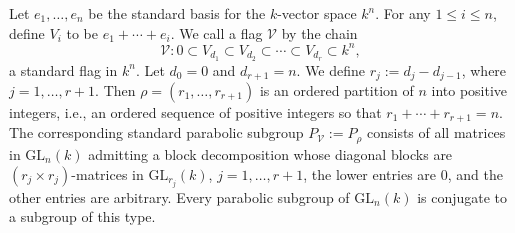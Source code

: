 \documentclass[12pt]{article} %
\begin{document}
Let \( e_1, \ldots, e_n \) be the standard basis for the \( k \)-vector space \( k^n \). For any \( 1 \leq i \leq n \), define \( V_i \) to be \( e_1 + \cdots + e_i \). We call a flag \( \mathcal{V} \) by the chain
\[
    \mathcal{V}: 0 \subset V_{d_1} \subset V_{d_2} \subset \cdots \subset V_{d_r} \subset k^n,
\]
a standard flag in \( k^n \). Let \( d_0 = 0 \) and \( d_{r+1} = n \). We define \( r_j := d_j - d_{j-1} \), where \( j = 1, \ldots, r+1 \). Then \( \rho = (r_1, \ldots, r_{r+1}) \) is an ordered partition of \( n \) into positive integers, i.e., an ordered sequence of positive integers so that \( r_1 + \cdots + r_{r+1} = n \). The corresponding standard parabolic subgroup \( P_{\mathcal{V}} := P_{\rho} \) consists of all matrices in \( \text{GL}_n(k) \) admitting a block decomposition whose diagonal blocks are \( (r_j \times r_j) \)-matrices in \( \text{GL}_{r_j}(k) \), \( j = 1, \ldots, r+1 \), the lower entries are 0, and the other entries are arbitrary. Every parabolic subgroup of \( \text{GL}_n(k) \) is conjugate to a subgroup of this type.
\end{document}
